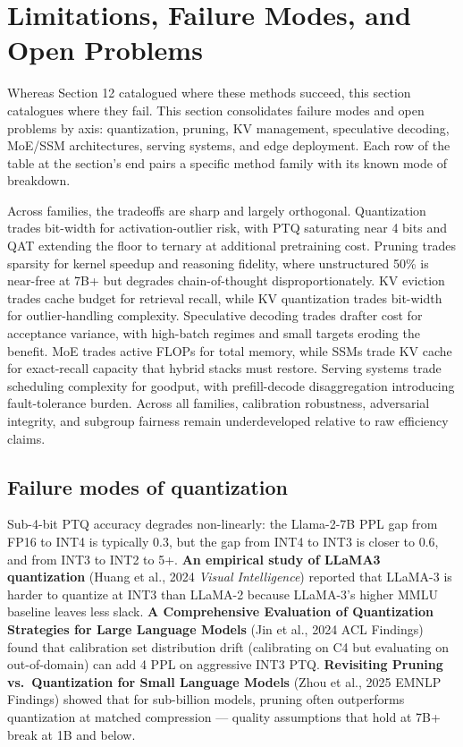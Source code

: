 \documentclass{article}
\begin{document}
\section{Limitations, Failure Modes, and Open Problems}\label{limitations-failure-modes-and-open-problems}

Whereas Section 12 catalogued where these methods succeed, this section catalogues where they fail. This section consolidates failure modes and open problems by axis: quantization, pruning, KV management, speculative decoding, MoE/SSM architectures, serving systems, and edge deployment. Each row of the table at the section's end pairs a specific method family with its known mode of breakdown.

Across families, the tradeoffs are sharp and largely orthogonal. Quantization trades bit-width for activation-outlier risk, with PTQ saturating near 4 bits and QAT extending the floor to ternary at additional pretraining cost. Pruning trades sparsity for kernel speedup and reasoning fidelity, where unstructured 50\% is near-free at 7B+ but degrades chain-of-thought disproportionately. KV eviction trades cache budget for retrieval recall, while KV quantization trades bit-width for outlier-handling complexity. Speculative decoding trades drafter cost for acceptance variance, with high-batch regimes and small targets eroding the benefit. MoE trades active FLOPs for total memory, while SSMs trade KV cache for exact-recall capacity that hybrid stacks must restore. Serving systems trade scheduling complexity for goodput, with prefill-decode disaggregation introducing fault-tolerance burden. Across all families, calibration robustness, adversarial integrity, and subgroup fairness remain underdeveloped relative to raw efficiency claims.

\subsection{Failure modes of quantization}\label{failure-modes-of-quantization}

Sub-4-bit PTQ accuracy degrades non-linearly: the Llama-2-7B PPL gap from FP16 to INT4 is typically 0.3, but the gap from INT4 to INT3 is closer to 0.6, and from INT3 to INT2 to 5+. \textbf{An empirical study of LLaMA3 quantization} (Huang et al., 2024 \emph{Visual Intelligence}) reported that LLaMA-3 is harder to quantize at INT3 than LLaMA-2 because LLaMA-3's higher MMLU baseline leaves less slack. \textbf{A Comprehensive Evaluation of Quantization Strategies for Large Language Models} (Jin et al., 2024 ACL Findings) found that calibration set distribution drift (calibrating on C4 but evaluating on out-of-domain) can add 4 PPL on aggressive INT3 PTQ. \textbf{Revisiting Pruning vs.~Quantization for Small Language Models} (Zhou et al., 2025 EMNLP Findings) showed that for sub-billion models, pruning often outperforms quantization at matched compression --- quality assumptions that hold at 7B+ break at 1B and below.
\end{document}
